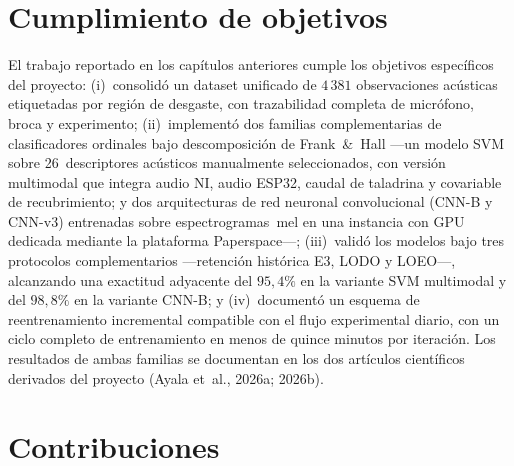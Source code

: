 \documentclass[12pt, letterpaper]{report}
\begin{document}
\section{Cumplimiento de objetivos}

El trabajo reportado en los capítulos anteriores cumple los objetivos
específicos del proyecto: (i)~consolidó un dataset unificado de
$4\,381$ observaciones acústicas etiquetadas por región de desgaste,
con trazabilidad completa de micrófono, broca y experimento;
(ii)~implementó dos familias complementarias de clasificadores
ordinales bajo descomposición de Frank~\&~Hall ---un modelo SVM sobre
26~descriptores acústicos manualmente seleccionados, con versión
multimodal que integra audio NI, audio ESP32, caudal de taladrina y
covariable de recubrimiento; y dos arquitecturas de red neuronal
convolucional (CNN-B y CNN-v3) entrenadas sobre espectrogramas~mel en
una instancia con GPU dedicada mediante la plataforma Paperspace---;
(iii)~validó los modelos bajo tres protocolos complementarios
---retención histórica E3, LODO y LOEO---, alcanzando una exactitud
adyacente del $95{,}4\%$ en la variante SVM multimodal y del
$98{,}8\%$ en la variante CNN-B; y (iv)~documentó un esquema de
reentrenamiento incremental compatible con el flujo experimental
diario, con un ciclo completo de entrenamiento en menos de quince
minutos por iteración. Los resultados de ambas familias se documentan
en los dos artículos científicos derivados del proyecto
(Ayala et~al., 2026a; 2026b).

\section{Contribuciones}
\end{document}
